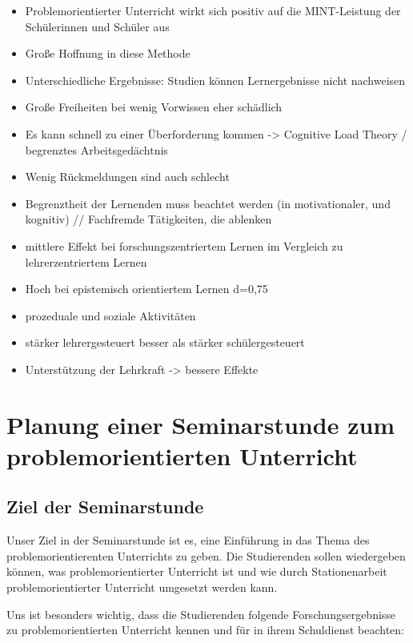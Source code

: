 \documentclass[man,12pt,a4paper]{apa6}
\begin{document}
\begin{itemize}
  \item Problemorientierter Unterricht wirkt sich positiv auf die MINT-Leistung der Schülerinnen und Schüler aus\cite{seidel2016}
  \item Große Hoffnung in diese Methode\cite{kunter2013}
  \item Unterschiedliche Ergebnisse: Studien können Lernergebnisse nicht nachweisen\cite{kunter2013}
  \item Große Freiheiten bei wenig Vorwissen eher schädlich\cite{kunter2013}
  \item Es kann schnell zu einer Überforderung kommen\cite{kunter2013} -> Cognitive Load Theory / begrenztes Arbeitsgedächtnis
  \item Wenig Rückmeldungen sind auch schlecht\cite{kunter2013}
  \item Begrenztheit der Lernenden muss beachtet werden (in motivationaler, und kognitiv) // Fachfremde Tätigkeiten, die ablenken\cite{kunter2013}
  \item mittlere Effekt bei forschungszentriertem Lernen im Vergleich zu lehrerzentriertem Lernen
  \item Hoch bei epistemisch orientiertem Lernen d=0,75
  \item prozeduale und soziale Aktivitäten
  \item stärker lehrergesteuert besser als stärker schülergesteuert
  \item Unterstützung der Lehrkraft -> bessere Effekte
\end{itemize}

\section{Planung einer Seminarstunde zum problemorientierten Unterricht}

\subsection{Ziel der Seminarstunde}

Unser Ziel in der Seminarstunde ist es, eine Einführung in das Thema des problemorientierenten Unterrichts zu geben. Die Studierenden sollen wiedergeben können, was problemorientierter Unterricht ist und wie durch Stationenarbeit problemorientierter Unterricht umgesetzt werden kann.

Uns ist besonders wichtig, dass die Studierenden folgende Forschungsergebnisse zu problemorientierten Unterricht kennen und für in ihrem Schuldienst beachten:
\end{document}
